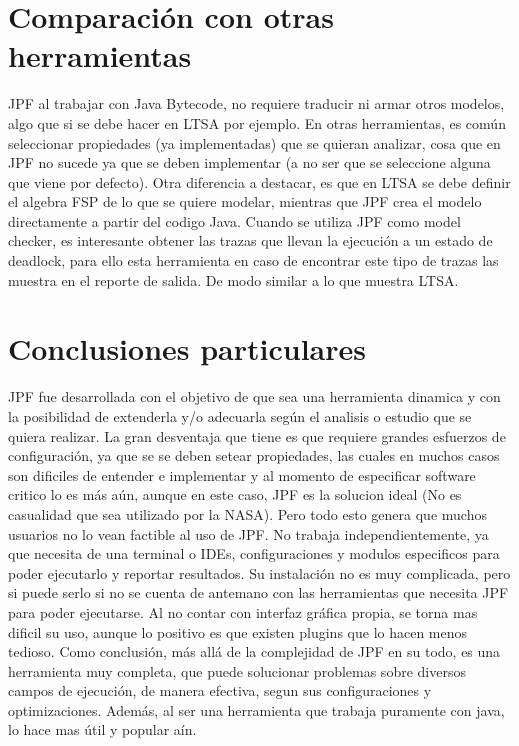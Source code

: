 \documentclass[runningheads]{llncs}
\begin{document}
\section{Comparaci\'on con otras herramientas}

JPF al trabajar con Java Bytecode, no requiere traducir ni armar otros modelos, algo que si se debe hacer en LTSA por ejemplo. En otras herramientas, es com\'un seleccionar propiedades (ya implementadas) que se quieran analizar, cosa que en JPF no sucede ya que se deben implementar (a no ser que se seleccione alguna que viene por defecto).
Otra diferencia a destacar, es que en LTSA se debe definir el algebra FSP de lo que se quiere modelar, mientras que JPF crea el modelo directamente a partir del codigo Java.
Cuando se utiliza JPF como model checker, es interesante obtener las trazas que llevan la ejecuci\'on a un estado de deadlock, para ello esta herramienta en caso de encontrar este tipo de trazas las muestra en el reporte de salida. De modo similar a lo que muestra LTSA.


\section{Conclusiones particulares}

JPF fue desarrollada con el objetivo de que sea una herramienta dinamica y con la posibilidad de extenderla y/o adecuarla seg\'un el analisis o estudio que se quiera realizar. La gran desventaja que tiene es que requiere grandes esfuerzos de configuraci\'on, ya que se se deben setear propiedades, las cuales en muchos casos son dificiles de entender e implementar y al momento de especificar software critico lo es m\'as a\'un, aunque en este caso, JPF es la solucion ideal (No es casualidad que sea utilizado por la NASA). Pero todo esto genera que muchos usuarios no lo vean factible al uso de JPF.
No trabaja independientemente, ya que necesita de una terminal o IDEs, configuraciones y modulos especificos para poder ejecutarlo y reportar resultados. Su instalaci\'on no es muy complicada, pero si puede serlo si no se cuenta de antemano con las herramientas que necesita JPF para poder ejecutarse. Al no contar con interfaz gr\'afica propia, se torna mas dificil su uso, aunque lo positivo es que existen plugins que lo hacen menos tedioso.
Como conclusi\'on, m\'as all\'a de la complejidad de JPF en su todo, es una herramienta muy completa, que puede solucionar problemas sobre diversos campos de ejecuci\'on, de manera efectiva, segun sus configuraciones y optimizaciones. Adem\'as, al ser una herramienta que trabaja puramente con java, lo hace mas \'util y popular a\'in.
\end{document}
